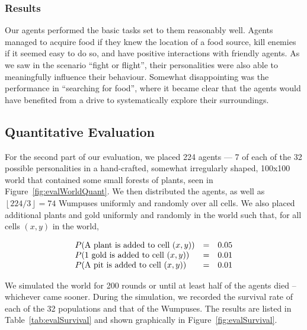 \subsubsection{Results}

Our agents performed the basic tasks set to them reasonably well. Agents managed to acquire food if they knew the location of a food source, kill enemies if it seemed easy to do so, and have positive interactions with friendly agents. As we saw in the scenario ``fight or flight'', their personalities were also able to meaningfully influence their behaviour. Somewhat disappointing was the performance in ``searching for food'', where it became clear that the agents would have benefited from a drive to systematically explore their surroundings.

\subsection{Quantitative Evaluation}

For the second part of our evaluation, we placed 224 agents --- 7 of each of the 32 possible personalities in a hand-crafted, somewhat irregularly shaped, 100x100 world that contained some small forests of plants, seen in Figure~\ref{fig:evalWorldQuant}. We then distributed the agents, as well as $\left\lfloor 224/3 \right\rfloor = 74$ Wumpuses uniformly and randomly over all cells. We also placed additional plants and gold uniformly and randomly in the world such that, for all cells $(x,y)$ in the world,

$$
	\begin{array}{l l l}
		P(\textrm{A plant is added to cell } (x,y)) & = & 0.05\\
		P(\textrm{1 gold is added to cell } (x,y)) & = & 0.01\\
		P(\textrm{A pit is added to cell } (x,y)) & = & 0.01
	\end{array}
$$

We simulated the world for 200 rounds or until at least half of the agents died -- whichever came sooner. During the simulation, we recorded the survival rate of each of the 32 populations and that of the Wumpuses. The results are listed in Table~\ref{tab:evalSurvival} and shown graphically in Figure~\ref{fig:evalSurvival}.

